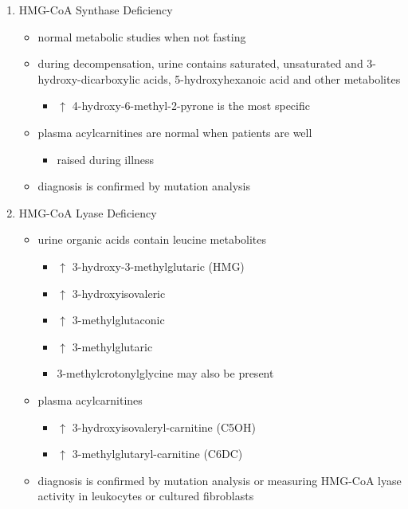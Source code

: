\documentclass[12pt]{scrartcl}
\begin{document}
\begin{enumerate}
\item HMG-CoA Synthase Deficiency
\label{sec:org226e58e}
\begin{itemize}
\item normal metabolic studies when not fasting
\item during decompensation, urine contains saturated, unsaturated and
3-hydroxy-dicarboxylic acids, 5-hydroxyhexanoic acid and other
metabolites
\begin{itemize}
\item \(\uparrow\) 4-hydroxy-6-methyl-2-pyrone is the most specific
\end{itemize}
\item plasma acylcarnitines are normal when patients are well
\begin{itemize}
\item raised during illness
\end{itemize}
\item diagnosis is confirmed by mutation analysis
\end{itemize}

\item HMG-CoA Lyase Deficiency
\label{sec:orgbbd22c8}
\begin{itemize}
\item urine organic acids contain leucine metabolites
\begin{itemize}
\item \(\uparrow\) 3-hydroxy-3-methylglutaric (HMG)
\item \(\uparrow\) 3-hydroxyisovaleric
\item \(\uparrow\) 3-methylglutaconic
\item \(\uparrow\) 3-methylglutaric
\item 3-methylcrotonylglycine may also be present
\end{itemize}
\item plasma acylcarnitines
\begin{itemize}
\item \(\uparrow\) 3-hydroxyisovaleryl-carnitine (C5OH)
\item \(\uparrow\) 3-methylglutaryl-carnitine (C6DC)
\end{itemize}
\item diagnosis is confirmed by mutation analysis or measuring HMG-CoA
lyase activity in leukocytes or cultured fibroblasts
\end{itemize}
\end{enumerate}
\end{document}
